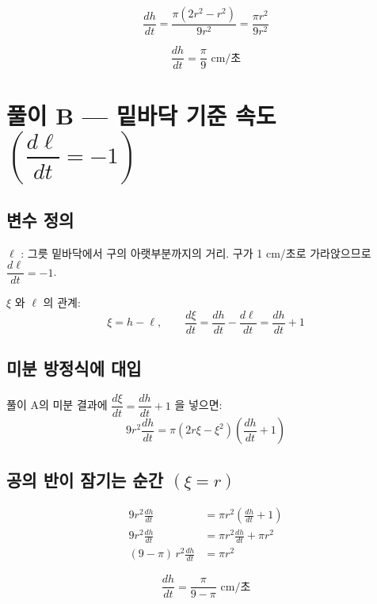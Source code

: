 \[
  \frac{dh}{dt}
    = \frac{\pi(2r^2 - r^2)}{9r^2}
    = \frac{\pi r^2}{9r^2}
\]

\[
  \boxed{\dfrac{dh}{dt} = \dfrac{\pi}{9} \text{ cm/초}}
\]

\section*{풀이 B — 밑바닥 기준 속도 $\left(\dfrac{d\ell}{dt}=-1\right)$}

\subsection*{변수 정의}

$\ell$ : 그릇 밑바닥에서 구의 아랫부분까지의 거리.
구가 1 cm/초로 가라앉으므로 $\dfrac{d\ell}{dt} = -1$.

$\xi$ 와 $\ell$ 의 관계:
\[
  \xi = h - \ell, \qquad
  \frac{d\xi}{dt} = \frac{dh}{dt} - \frac{d\ell}{dt} = \frac{dh}{dt} + 1
\]

\subsection*{미분 방정식에 대입}

풀이 A의 미분 결과에 $\dfrac{d\xi}{dt} = \dfrac{dh}{dt}+1$ 을 넣으면:
\[
  9r^2 \frac{dh}{dt} = \pi(2r\xi - \xi^2)\!\left(\frac{dh}{dt} + 1\right)
\]

\subsection*{공의 반이 잠기는 순간 $(\xi = r)$}

\begin{align*}
  9r^2 \frac{dh}{dt} &= \pi r^2\!\left(\frac{dh}{dt} + 1\right) \\
  9r^2 \frac{dh}{dt} &= \pi r^2 \frac{dh}{dt} + \pi r^2 \\
  (9 - \pi)\,r^2 \frac{dh}{dt} &= \pi r^2
\end{align*}

\[
  \boxed{\dfrac{dh}{dt} = \dfrac{\pi}{9 - \pi} \text{ cm/초}}
\]
